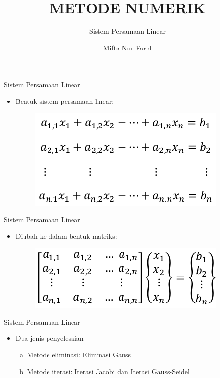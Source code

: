 \documentclass[pdflatex,compress,mathserif]{beamer}
\title{METODE NUMERIK}
\subtitle{Sistem Persamaan Linear}
\author{Mifta Nur Farid}
\begin{document}
\maketitle

\begin{frame}{Sistem Persamaan Linear}
    \begin{itemize}
        \item Bentuk sistem persamaan linear:
        \begin{figure}
            \includegraphics[width=0.7\linewidth]{./img/img01.png}
        \end{figure}
    \end{itemize}
\end{frame}

\begin{frame}{Sistem Persamaan Linear}
    \begin{itemize}
        \item Diubah ke dalam bentuk matriks:
        \begin{figure}
            \includegraphics[width=0.7\linewidth]{./img/img02.png}
        \end{figure}
    \end{itemize}
\end{frame}

\begin{frame}{Sistem Persamaan Linear}
    \begin{itemize}
        \item Dua jenis penyelesaian
        \begin{enumerate}[a.]
            \item Metode eliminasi: Eliminasi Gauss
            \item Metode iterasi: Iterasi Jacobi dan Iterasi Gauss-Seidel
        \end{enumerate}
    \end{itemize}
\end{frame}
\end{document}
